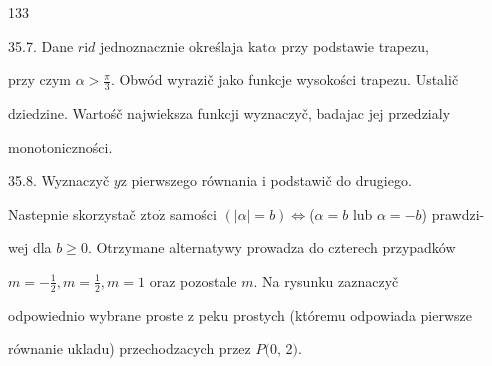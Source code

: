 \documentclass[a4paper,12pt]{article}
\begin{document}
133

35.7. Dane $r\mathrm{i}d$ jednoznacznie określaja $\mathrm{k}\mathrm{a}\mathrm{t}\alpha$ przy podstawie trapezu,

przy czym $\displaystyle \alpha>\frac{\pi}{3}$. Obwód wyrazič jako funkcje wysokości trapezu. Ustalič

dziedzine. Wartośč najwieksza funkcji wyznaczyč, badajac jej przedzialy

monotoniczności.

35.8. Wyznaczyč $y \mathrm{z}$ pierwszego równania $\mathrm{i}$ podstawič do drugiego.

Nastepnie skorzystač $\mathrm{z}\mathrm{t}\mathrm{o}\dot{\mathrm{z}}$ samości $(|\alpha|=b)\Leftrightarrow$($\alpha=b$ lub $\alpha=-b$) prawdzi-

wej dla $b\geq 0$. Otrzymane alternatywy prowadza do czterech przypadków

$m = -\displaystyle \frac{1}{2}, m = \displaystyle \frac{1}{2}, m = 1$ oraz pozostale $m$. Na rysunku zaznaczyč

odpowiednio wybrane proste $\mathrm{z}$ peku prostych (któremu odpowiada pierwsze

równanie ukladu) przechodzacych przez $P(0$, 2$).$
\end{document}
